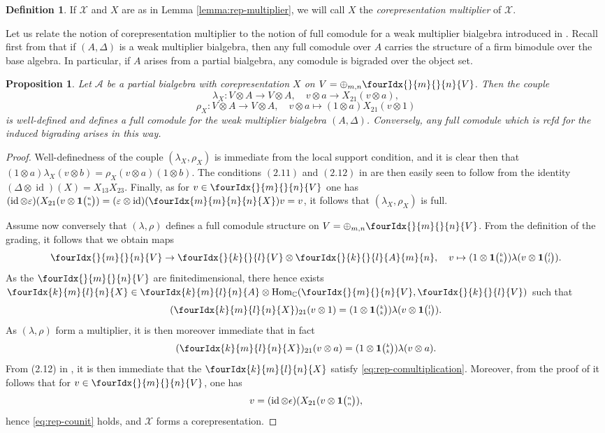 \documentclass[10pt]{article}
\DeclareMathOperator{\id}{id}
\DeclareMathOperator{\Hom}{Hom}
\newcommand{\C}{\mathbb{C}}
\newcommand{\Grt}[3]{#1{\tiny {\begin{pmatrix} #2\\#3\end{pmatrix}}}}
\newcommand{\UnitC}[2]{\Grt{\mathbf{1}}{#1}{#2}}
\newcommand{\Gr}[5]{\fourIdx{#2}{#4}{#3}{#5}{#1}}%
\newcommand{\Gru}[3]{\Gr{#1}{}{}{#2}{#3}}
\newtheorem{Prop}[Theorem]{Proposition}
\theoremstyle{definition}
\newtheorem{Def}[Theorem]{Definition}
\numberwithin{equation}{section}
\begin{document}
\begin{Def} If $\mathscr{X}$ and $X$ are as in Lemma \ref{lemma:rep-multiplier}, we will call $X$ the \emph{corepresentation multiplier} of $\mathscr{X}$. 
\end{Def}

Let us relate the notion of corepresentation multiplier to the notion of full comodule for a weak multiplier bialgebra introduced in \cite[Definition 2.2 and Definition 4.2]{Boh2}. Recall first from \cite[Theorem 4.5]{Boh2} that if $(A,\Delta)$ is a weak multiplier bialgebra, then any full comodule over $A$ carries the structure of a firm bimodule over the base algebra. In particular, if $A$ arises from a partial bialgebra, any comodule is bigraded over the object set. 

\begin{Prop} Let $\mathscr{A}$ be a partial bialgebra with corepresentation $X$ on $V = \oplus_{m,n} \Gru{V}{m}{n}$. Then the couple \[\lambda_X: V\otimes A \rightarrow V\otimes A,\quad v\otimes a \rightarrow X_{21}(v\otimes a),\] 
\[\rho_X: V\otimes A\rightarrow V\otimes A,\quad v\otimes a \mapsto (1\otimes a)X_{21}(v\otimes 1)\] is well-defined and defines a full comodule for the weak multiplier bialgebra $(A,\Delta)$. Conversely, any full comodule which is rcfd for the induced bigrading arises in this way.
\end{Prop} 

\begin{proof} Well-definedness of the couple $(\lambda_X,\rho_X)$ is immediate from the local support condition, and it is clear then that $(1\otimes a)\lambda_X(v\otimes b) = \rho_X(v\otimes a)(1\otimes b)$.  The conditions $(2.11)$ and $(2.12)$ in \cite[Definition 2.12]{Boh2} are then easily seen to follow from the identity $(\Delta\otimes \id)(X) = X_{13}X_{23}$. Finally, as for $v\in \Gru{V}{m}{n}$ one has $(\id\otimes \varepsilon)(X_{21}(v\otimes \UnitC{n}{n}) = (\varepsilon\otimes \id)(\Gr{X}{m}{n}{m}{n}) v  = v$, it follows that $(\lambda_X,\rho_X)$ is full.

Assume now conversely that $(\lambda,\rho)$ defines a full comodule structure on $V = \oplus_{m,n} \Gru{V}{m}{n}$. From the definition of the grading, it follows that we obtain maps \[\Gru{V}{m}{n}\rightarrow \Gru{V}{k}{l}\otimes \Gru{A}{k}{l}{m}{n},\quad v \mapsto (1\otimes \UnitC{k}{k})\lambda(v\otimes \UnitC{l}{l}).\] As the $\Gru{V}{m}{n}$ are finitedimensional, there hence exists $\Gr{X}{k}{l}{m}{n} \in \Gr{A}{k}{l}{m}{n}\otimes \Hom_{\C}(\Gru{V}{m}{n},\Gru{V}{k}{l})$ such that  
\[(\Gr{X}{k}{l}{m}{n})_{21}(v\otimes 1)=(1\otimes \UnitC{k}{k})\lambda(v\otimes \UnitC{l}{l}).\] As $(\lambda,\rho)$ form a multiplier, it is then moreover immediate that in fact \[(\Gr{X}{k}{l}{m}{n})_{21}(v\otimes a) = (1\otimes \UnitC{k}{k})\lambda(v\otimes a).\] From (2.12) in \cite[Definition 2.12]{Boh2}, it is then immediate that the $\Gr{X}{k}{l}{m}{n}$ satisfy \eqref{eq:rep-comultiplication}. Moreover, from the proof of \cite[Theorem 4.5]{Boh2} it follows that for $v\in \Gru{V}{m}{n}$, one has \[v = (\id\otimes \epsilon)(X_{21}(v\otimes \UnitC{n}{n}),\] hence \eqref{eq:rep-counit} holds, and $\mathscr{X}$ forms a corepresentation. %
\end{proof}
\end{document}
